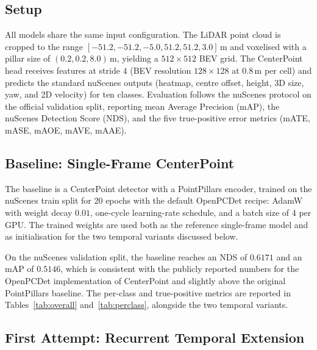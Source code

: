 \documentclass[12pt,a4paper]{report}
\begin{document}
\subsection{Setup}
\quad All models share the same input configuration. The LiDAR
point cloud is cropped to the range
$[-51.2, -51.2, -5.0, 51.2, 51.2, 3.0]\,\text{m}$ and voxelised
with a pillar size of $(0.2, 0.2, 8.0)\,\text{m}$, yielding a
$512 \times 512$ BEV grid. The CenterPoint head receives features
at stride $4$ (BEV resolution $128 \times 128$ at $0.8\,\text{m}$
per cell) and predicts the standard nuScenes outputs (heatmap,
centre offset, height, 3D size, yaw, and 2D velocity) for ten
classes. Evaluation follows the nuScenes protocol on the official
validation split, reporting mean Average Precision (mAP), the
nuScenes Detection Score (NDS), and the five true-positive error
metrics (mATE, mASE, mAOE, mAVE, mAAE).

\subsection{Baseline: Single-Frame CenterPoint}
\quad The baseline is a CenterPoint detector with a PointPillars
encoder, trained on the nuScenes train split for 20 epochs with the
default OpenPCDet recipe: AdamW with weight decay $0.01$, one-cycle
learning-rate schedule, and a batch size of 4 per GPU. The trained
weights are used both as the reference single-frame model and as
initialisation for the two temporal variants discussed below.

\quad On the nuScenes validation split, the baseline reaches an NDS
of $0.6171$ and an mAP of $0.5146$, which is consistent with the
publicly reported numbers for the OpenPCDet implementation of
CenterPoint and slightly above the original PointPillars baseline.
The per-class and true-positive metrics are reported in
Tables~\ref{tab:overall} and~\ref{tab:perclass}, alongside the two
temporal variants.

\subsection{First Attempt: Recurrent Temporal Extension}
\end{document}
